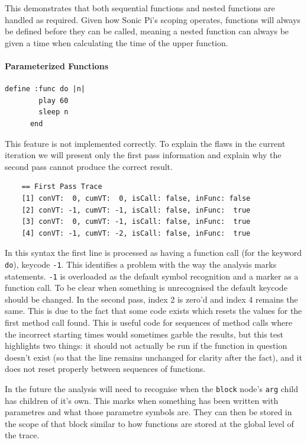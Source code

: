 \documentclass[11pt, abstracton, twoside, titlepage=true]{scrartcl}
\begin{document}
This demonstrates that both sequential functions and nested functions are handled 
as required. Given how Sonic Pi's scoping operates, functions will always be defined 
before they can be called, meaning a nested function can always be given a time when 
calculating the time of the upper function.

\paragraph{Parameterized Functions}
\begin{minipage}{\textwidth}
	\begin{lstlisting}[style = sonicpi]
      define :func do |n|
        play 60
        sleep n
      end
	\end{lstlisting}
\end{minipage}

This feature is not implemented correctly. To explain the flaws in the current 
iteration we will present only the first pass information and explain why the second 
pass cannot produce the correct result.
\\
\begin{lstlisting}
    == First Pass Trace
    [1] conVT:  0, cumVT:  0, isCall: false, inFunc: false
    [2] conVT: -1, cumVT: -1, isCall: false, inFunc:  true
    [3] conVT:  0, cumVT: -1, isCall: false, inFunc:  true
    [4] conVT: -1, cumVT: -2, isCall: false, inFunc:  true
\end{lstlisting}

In this syntax the first line is processed as having a function call (for 
the keyword \texttt{do}), keycode \texttt{-1}. This identifies a problem with the 
way the analysis marks statements. \texttt{-1} is overloaded as the default symbol 
recognition and a marker as a function call. To be clear when something is 
unrecognised the default keycode should be changed. In the second pass, index 2 
is zero'd and index 4 remains the same. This is due to the fact that some code 
exists which resets the values for the first method call found. This is useful 
code for sequences of method calls where the incorrect starting times would 
sometimes garble the results, but this test highlights two things: it should not 
actually be run if the function in question doesn't exist (so that the line 
remains unchanged for clarity after the fact), and it does not reset properly 
between sequences of functions.

In the future the analysis will need to recognise when the \texttt{block} node's
\texttt{arg} child has children of it's own. This marks when something has been 
written with parametres and what those parametre symbols are. They can then be 
stored in the scope of that block similar to how functions are stored at the global 
level of the trace. 
\end{document}
